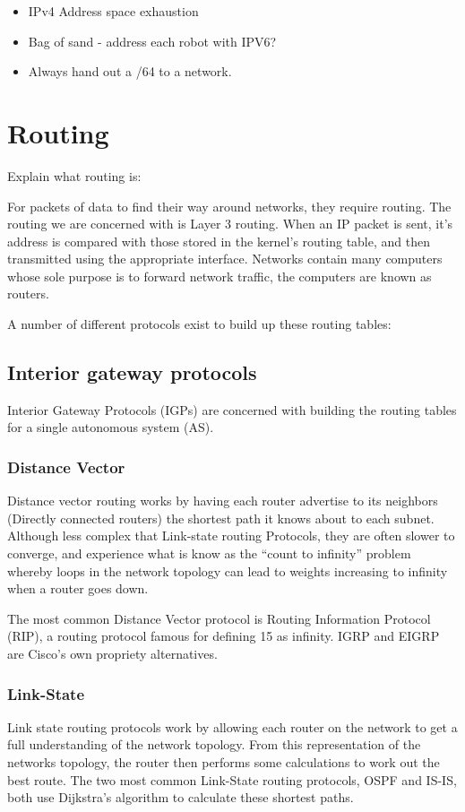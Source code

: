 \documentclass[12pt]{report}
\begin{document}
\begin{itemize}
\item IPv4 Address space exhaustion
\item Bag of sand - address each robot with IPV6?
\item Always hand out a /64 to a network.
\end{itemize}

\section{Routing}
Explain what routing is:

For packets of data to find their way around networks, they require
routing. The routing we are concerned with is Layer 3 routing. When an IP
packet is sent, it's address is compared with those stored in the kernel's
routing table, and then transmitted using the appropriate interface. Networks
contain many computers whose sole purpose is to forward network traffic, the
computers are known as routers. 

A number of different protocols exist to build up these routing tables:

\subsection{Interior gateway protocols}
Interior Gateway Protocols (IGPs) are concerned with building the routing
tables for a single autonomous system (AS). 

\subsubsection{Distance Vector}
Distance vector routing works by having each router advertise to its neighbors
(Directly connected routers) the shortest path it knows about to each subnet.
Although less complex that Link-state routing Protocols, they are often slower
to converge, and experience what is know as the ``count to infinity'' problem
whereby loops in the network topology can lead to weights increasing to
infinity when a router goes down. 

The most common Distance Vector protocol is Routing Information Protocol (RIP),
a routing protocol famous for defining 15 as infinity. IGRP and EIGRP are
Cisco's own propriety alternatives.

\subsubsection{Link-State}
Link state routing protocols work by allowing each router on the network to get
a full understanding of the network topology. From this representation of the
networks topology, the router then performs some calculations to work out the
best route. The two most common Link-State routing protocols, OSPF and IS-IS,
both use Dijkstra's algorithm to calculate these shortest paths. 
\end{document}
